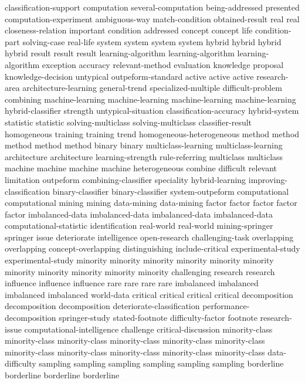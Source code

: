 classification-support	
computation	
several-computation	
being-addressed	
presented	
computation-experiment	
ambiguous-way	
match-condition	
obtained-result	
real	real	
closeness-relation	
important	
condition	
addressed	
concept	concept	
life	
condition-part	
solving-case	
real-life	
system	system	system	system	
hybrid	hybrid	hybrid	hybrid	
result	result	result	
learning-algorithm	learning-algorithm	learning-algorithm	
exception	
accuracy	
relevant-method	
evaluation	
knowledge	
proposal	
knowledge-decision	
untypical	
outpeform-standard	
active	active	active	
research-area	
architecture-learning	
general-trend	
specialized-multiple	
difficult-problem	
combining	
machine-learning	machine-learning	machine-learning	machine-learning	
hybrid-classifier	
strength	
untypical-situation	
classification-accuracy	
hybrid-system	
statistic	statistic	
solving-multiclass	solving-multiclass	
classifier-result	
homogeneous	
training	training	
trend	
homogeneous-heterogeneous	
method	method	method	method	method	
binary	binary	
multiclass-learning	multiclass-learning	
architecture	architecture	
learning-strength	
rule-referring	
multiclass	multiclass	
machine	machine	machine	machine	
heterogeneous	
combine	
difficult	
relevant	
limitation	
outpeform	
combining-classifier	
speciality	
hybrid-learning	
improving-classification	
binary-classifier	binary-classifier	
system-outpeform	
computational	computational	
mining	mining	
data-mining	data-mining	
factor	factor	factor	factor	factor	
imbalanced-data	imbalanced-data	imbalanced-data	imbalanced-data	
computational-statistic	
identification	
real-world	real-world	
mining-springer	
springer	
issue	
deteriorate	
intelligence	
open-research	
challenging-task	
overlapping	overlapping	
concept-overlapping	
distinguishing	
include-critical	
experimental-study	experimental-study	
minority	minority	minority	minority	minority	minority	minority	minority	minority	minority	minority	
challenging	
research	research	
influence	influence	influence	
rare	rare	rare	rare	
imbalanced	imbalanced	imbalanced	imbalanced	
world-data	
critical	critical	critical	critical	
decomposition	decomposition	decomposition	
deteriorate-classification	
performance-decomposition	
springer-study	
stated-footnote	
difficulty-factor	
footnote	
research-issue	
computational-intelligence	
challenge	
critical-discussion	
minority-class	minority-class	minority-class	minority-class	minority-class	minority-class	minority-class	minority-class	minority-class	minority-class	minority-class	
data-difficulty	
sampling	sampling	sampling	sampling	sampling	sampling	
borderline	borderline	borderline	borderline	

